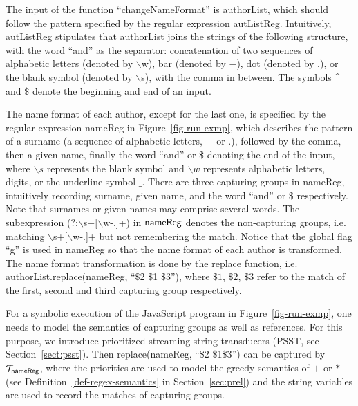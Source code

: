 The input of the function ``changeNameFormat'' is {\sf authorList}, which should follow the pattern specified by the regular expression {\sf autListReg}. Intuitively, {\sf autListReg} stipulates that {\sf authorList} %
joins the strings of the following structure, with the word ``and'' as the separator: concatenation of two sequences of alphabetic letters (denoted by $\backslash$w), bar (denoted by $-$), dot (denoted by $.$), or the blank symbol (denoted by $\backslash$s), with the comma in between. The symbols \^{} and $\$$ denote the beginning and end of an input.

The name format of each author, except for the last one, is specified by the regular expression {\sf nameReg}  in Figure~\ref{fig-run-exmp}, which describes the pattern of a surname (a sequence of alphabetic letters, $-$ or $.$), followed by the comma, then a given name, finally the word ``and'' or $\$$ denoting the end of the input, where $\backslash s$ represents the blank symbol and $\backslash w$ represents alphabetic letters, digits, or the underline symbol $\_$. There are three capturing groups in {\sf nameReg}, intuitively recording surname, given name, and the word ``and'' or $\$$ respectively. Note that surnames or given names may comprise several words. The subexpression (?:$\backslash$s+$[\backslash$w-.]+) in ${\sf nameReg}$ denotes the non-capturing groups, i.e. matching $\backslash$s+$[\backslash$w-.]+ but not remembering the match.
%
Notice that the global flag ``g'' is used in {\sf nameReg} so that the name format of each author is transformed. 
The name format transformation is done by the {\sf replace} function, i.e. {\sf authorList.replace(nameReg, ``$\$$2 $\$$1 $\$$3'')}, where $\$1$, $\$2$, $\$3$ refer to the match of the first, second and third capturing group respectively. 

For a symbolic execution of the JavaScript program in Figure~\ref{fig-run-exmp}, one needs to  model the semantics of capturing groups as well as references. For this purpose, we introduce prioritized streaming string transducers (PSST, see Section~\ref{sect:psst}). Then {\sf replace(nameReg, ``$\$$2 $\$$1$\$$3'')} can be captured by $\mathcal{T}_{\sf nameReg}$, where the priorities are used to model the greedy semantics of $+$ or $*$ (see Definition~\ref{def-regex-semantics} in Section~\ref{sec:prel}) and the string variables are used to record the matches of capturing groups.

